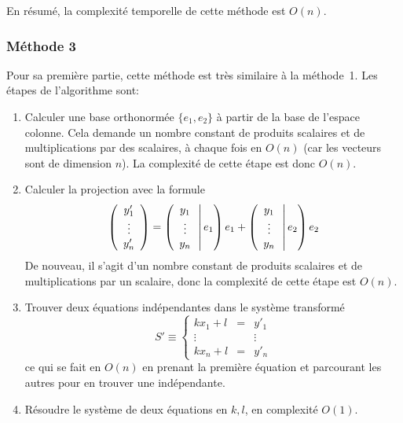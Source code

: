 En résumé, la complexité temporelle de cette méthode est $O(n)$.

\subsubsection*{Méthode 3}

Pour sa première partie, cette méthode est très similaire à la méthode~1.
Les étapes de l'algorithme sont:
\begin{enumerate}
    \item Calculer une base orthonormée $\{e_1,e_2\}$ à partir de la base
        de l'espace colonne. Cela demande un nombre constant de produits
        scalaires et de multiplications par des scalaires,
        à chaque fois en $O(n)$ (car les vecteurs sont de dimension $n$).
        La complexité de cette étape est donc $O(n)$.
    \item Calculer la projection avec la formule
        \begin{equation}
            \left(\begin{array}{c}y'_1\\\vdots\\y'_n\end{array}\right)
            =\left(\begin{array}{c}y_1\\\vdots\\y_n\end{array}\,\middle|\,e_1\right)e_1
            +\left(\begin{array}{c}y_1\\\vdots\\y_n\end{array}\,\middle|\,e_2\right)e_2
        \end{equation}
        De nouveau, il s'agit d'un nombre constant de produits scalaires
        et de multiplications par un scalaire, donc la complexité
        de cette étape est $O(n)$.
    \item Trouver deux équations indépendantes dans le système transformé
        \begin{equation}
            S' \equiv
            \left\{
                \begin{array}{ccc}
                    kx_1+l &=& y'_1\\
                    \vdots && \vdots\\
                    kx_n+l &=& y'_n
                \end{array}
            \right.
        \end{equation}
        ce qui se fait en $O(n)$ en prenant la première équation et
        parcourant les autres pour en trouver une indépendante.
    \item Résoudre le système de deux équations en $k,l$,
        en complexité $O(1)$.
\end{enumerate}

